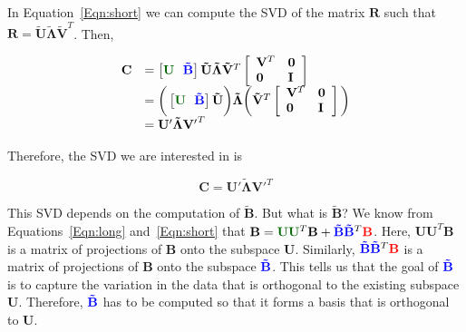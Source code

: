 In Equation~\ref{Eqn:short} we can compute the SVD of the matrix $\mathbf{R}$ such that $\mathbf{R}=\mathbf{\tilde{U}}\mathbf{\tilde{\Lambda}}\mathbf{\tilde{V}}^T$.  Then,

\begin{equation}
\begin{array}{llllll}
\mathbf{C} &= \left[{\color{darkgreen}\mathbf{U}} \ \ {\color{blue}\mathbf{\tilde{B}}}\right]\mathbf{\tilde{U}}\mathbf{\tilde{\Lambda}}\mathbf{\tilde{V}}^T \left[\begin{array}{llll}\mathbf{V}^T & \mathbf{0}\\ \mathbf{0} & \mathbf{I}\end{array}\right]\\
&= \bigg(\left[{\color{darkgreen}\mathbf{U}} \ \ {\color{blue}\mathbf{\tilde{B}}}\right]\mathbf{\tilde{U}}\bigg) \mathbf{\tilde{\Lambda}} \bigg(\mathbf{\tilde{V}}^T \left[\begin{array}{llll}\mathbf{V}^T & \mathbf{0}\\ \mathbf{0} & \mathbf{I}\end{array}\right]\bigg)\\
&=\mathbf{U'}\mathbf{\tilde{\Lambda}}\mathbf{V'}^T
\end{array}
\label{Eq:summary}
\end{equation}

Therefore, the SVD we are interested in is

\begin{equation}
\boxed{\mathbf{C}=\mathbf{U'}\mathbf{\tilde{\Lambda}}\mathbf{V'}^T}
\end{equation}

This SVD depends on the computation of $\mathbf{\tilde{B}}$.  But what is $\mathbf{\tilde{B}}$?  We know from Equations~\ref{Eqn:long} and~\ref{Eqn:short} that $\mathbf{B}={\color{darkgreen}\mathbf{U}}{\color{darkgreen}\mathbf{U}}^T\mathbf{B} + {\color{blue}\mathbf{\tilde{B}}} {{\color{blue}\mathbf{\tilde{B}}}^T}{\color{red}{\color{red}\mathbf{B}}}$.  Here, $\mathbf{U}\mathbf{U}^T\mathbf{B}$ is a matrix of projections of $\mathbf{B}$ onto the subspace $\mathbf{U}$.  Similarly, ${\color{blue}\mathbf{\tilde{B}}} {{\color{blue}\mathbf{\tilde{B}}}^T}{\color{red}{\color{red}\mathbf{B}}}$ is a matrix of projections of $\mathbf{B}$ onto the subspace ${\color{blue}\mathbf{\tilde{B}}}$.  This tells us that the goal of ${\color{blue}\mathbf{\tilde{B}}}$ is to capture the variation in the data that is orthogonal to the existing subspace $\mathbf{U}$.  Therefore, ${\color{blue}\mathbf{\tilde{B}}}$ has to be computed so that it forms a basis that is orthogonal to $\mathbf{U}$.  

